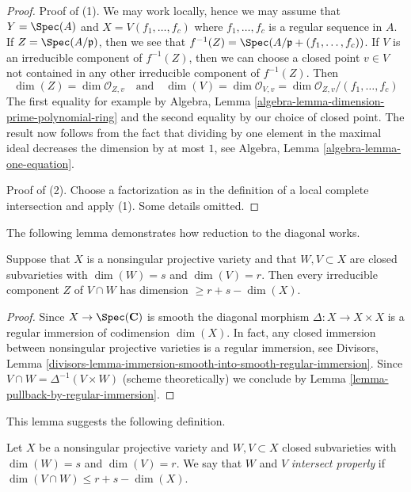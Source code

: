 \begin{proof}
Proof of (1). We may work locally, hence we may assume that
$Y = \Spec(A)$ and $X = V(f_1, \ldots, f_c)$ where $f_1, \ldots, f_c$
is a regular sequence in $A$. If $Z = \Spec(A/\mathfrak p)$, then
we see that $f^{-1}(Z) = \Spec(A/\mathfrak p + (f_1, \ldots, f_c))$.
If $V$ is an irreducible component of $f^{-1}(Z)$, then we can
choose a closed point $v \in V$ not contained in any other irreducible
component of $f^{-1}(Z)$. Then
$$
\dim(Z) = \dim \mathcal{O}_{Z, v}
\quad\text{and}\quad
\dim(V) = \dim \mathcal{O}_{V, v} = \dim \mathcal{O}_{Z, v}/(f_1, \ldots, f_c)
$$
The first equality for example by
Algebra, Lemma \ref{algebra-lemma-dimension-prime-polynomial-ring}
and the second equality by our choice of closed point.
The result now follows from the fact that dividing by one element
in the maximal ideal decreases the dimension by at most $1$, see
Algebra, Lemma \ref{algebra-lemma-one-equation}.

\medskip\noindent
Proof of (2). Choose a factorization as in the definition of a
local complete intersection and apply (1). Some details omitted.
\end{proof}

\noindent
The following lemma demonstrates how reduction to the diagonal works.

\begin{lemma}
\label{lemma-intersect-in-smooth}
Suppose that $X$ is a nonsingular projective variety and that $W,V \subset X$
are closed subvarieties with $\dim(W) = s$ and $\dim(V) = r$. Then every
irreducible component $Z$ of $V \cap W$ has dimension $\geq r + s - \dim(X)$. 
\end{lemma}

\begin{proof}
Since $X \to \Spec(\mathbf{C})$ is smooth the diagonal morphism
$\Delta : X \to X \times X$ is a regular immersion of codimension
$\dim(X)$. In fact, any closed immersion between nonsingular projective
varieties is a regular immersion, see Divisors,
Lemma \ref{divisors-lemma-immersion-smooth-into-smooth-regular-immersion}.
Since $V \cap W = \Delta^{-1}(V \times W)$ (scheme theoretically)
we conclude by Lemma \ref{lemma-pullback-by-regular-immersion}.
\end{proof}

\noindent
This lemma suggests the following definition.

\begin{definition}
\label{definition-proper-intersection}
Let $X$ be a nonsingular projective variety and $W,V \subset X$
closed subvarieties with $\dim(W) = s$ and $\dim(V) = r$.
We say that $W$ and $V$ {\it intersect properly} if
$\dim(V \cap W) \leq r + s - \dim(X)$.
\end{definition}

